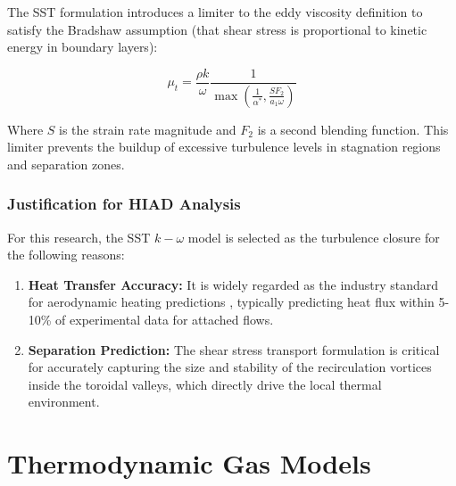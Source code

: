 The SST formulation introduces a limiter to the eddy viscosity definition to satisfy the Bradshaw assumption (that shear stress is proportional to kinetic energy in boundary layers):

\begin{equation}
    \mu_t = \frac{\rho k}{\omega} \frac{1}{\max\left( \frac{1}{\alpha^*}, \frac{S F_2}{a_1 \omega} \right)}
\end{equation}

Where $S$ is the strain rate magnitude and $F_2$ is a second blending function. This limiter prevents the buildup of excessive turbulence levels in stagnation regions and separation zones.

\subsubsection*{Justification for HIAD Analysis}
For this research, the SST $k-\omega$ model is selected as the turbulence closure for the following reasons:
\begin{enumerate}
    \item \textbf{Heat Transfer Accuracy:} It is widely regarded as the industry standard for aerodynamic heating predictions \cite{menter1994SST}, typically predicting heat flux within 5-10\% of experimental data for attached flows.
    \item \textbf{Separation Prediction:} The shear stress transport formulation is critical for accurately capturing the size and stability of the recirculation vortices inside the toroidal valleys, which directly drive the local thermal environment.
\end{enumerate}

\section{Thermodynamic Gas Models}

